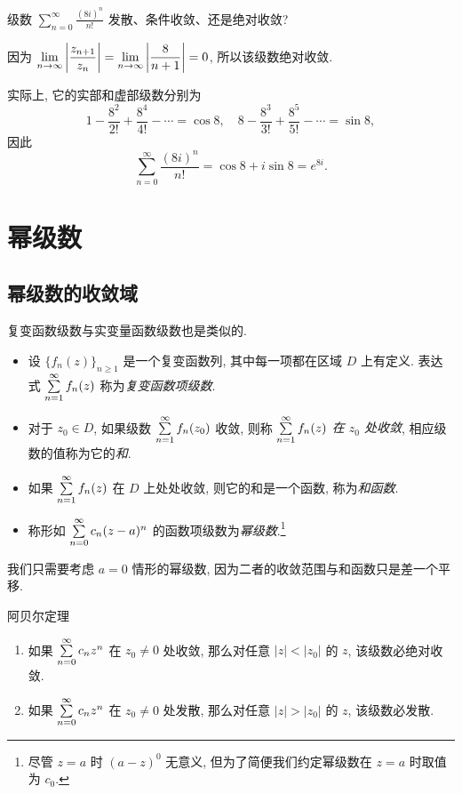 \begin{example}
	级数 $\displaystyle\sum_{n=0}^\infty\frac{(8i)^n}{n!}$ 发散、条件收敛、还是绝对收敛?
\end{example}

\begin{solution}
	因为 $\displaystyle\lim_{n\to\infty}\left|\frac{z_{n+1}}{z_n}\right|=\lim_{n\to\infty}\left|\dfrac{8}{n+1}\right|=0$, 所以该级数绝对收敛.
\end{solution}

实际上, 它的实部和虚部级数分别为
\[1-\frac{8^2}{2!}+\frac{8^4}{4!}-\cdots=\cos 8,\quad
8-\frac{8^3}{3!}+\frac{8^5}{5!}-\cdots=\sin 8,\]
因此
\[\sum_{n=0}^\infty\frac{(8i)^n}{n!}=\cos 8+i\sin 8=e^{8i}.\]

\section{幂级数}

\subsection{幂级数的收敛域}

复变函数级数与实变量函数级数也是类似的.

\begin{definition}
	\begin{itemize}
		\item 设 $\{f_n(z)\}_{n\ge 1}$ 是一个复变函数列, 其中每一项都在区域 $D$ 上有定义.
		表达式 $\sum\limits_{n=1}^\infty f_n(z)$ 称为\emph{复变函数项级数}.
		\item 对于 $z_0\in D$, 如果级数 $\sum\limits_{n=1}^\infty f_n(z_0)$ 收敛, 则称 \emph{$\sum\limits_{n=1}^\infty f_n(z)$ 在 $z_0$ 处收敛}, 相应级数的值称为它的\emph{和}.
		\item 如果 $\sum\limits_{n=1}^\infty f_n(z)$ 在 $D$ 上处处收敛, 则它的和是一个函数, 称为\emph{和函数}.
		\item 称形如 $\sum\limits_{n=0}^\infty c_n(z-a)^n$ 的函数项级数为\emph{幂级数}.\footnote{尽管 $z=a$ 时 $(a-z)^0$ 无意义, 但为了简便我们约定幂级数在 $z=a$ 时取值为 $c_0$.}
	\end{itemize}
\end{definition}

我们只需要考虑 $a=0$ 情形的幂级数, 因为二者的收敛范围与和函数只是差一个平移.

\begin{theorem}{阿贝尔定理}
	\begin{enumerate}
		\item 如果 $\sum\limits_{n=0}^\infty c_nz^n$ 在 $z_0\neq 0$ 处收敛, 那么对任意 $|z|<|z_0|$ 的 $z$, 该级数必绝对收敛.
		\item 如果 $\sum\limits_{n=0}^\infty c_nz^n$ 在 $z_0\neq 0$ 处发散, 那么对任意 $|z|>|z_0|$ 的 $z$, 该级数必发散.
	\end{enumerate}
\end{theorem}

